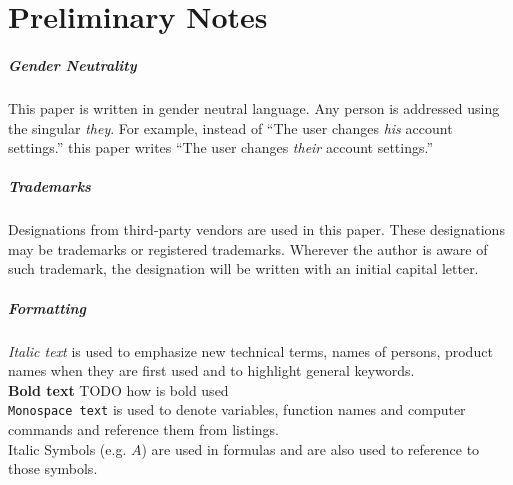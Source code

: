 \clearpage
\chapter*{Preliminary Notes}
\label{chap:prenotes}
\thispagestyle{scrheadings}

\paragraph{Gender Neutrality}
This paper is written in gender neutral language.
Any person is addressed using the singular \emph{they}.
For example, instead of
``The user changes \emph{his} account settings.''
this paper writes
``The user changes \emph{their} account settings.''


\paragraph{Trademarks}
Designations from third-party vendors are used in this paper.
These designations may be trademarks or registered trademarks.
Wherever the author is aware of such trademark,
the designation will be written with an initial capital letter.

\paragraph{Formatting}
\emph{Italic text} is used to emphasize new technical terms, names of persons, product names when they are first used and to highlight general keywords.\\ 
\textbf{Bold text} TODO how is bold used \\ 
\texttt{Monospace text} is used to denote variables,  function names and computer commands and reference them from listings.\\
Italic Symbols (e.g. $A$) are used in formulas and are also used to reference to those symbols.
